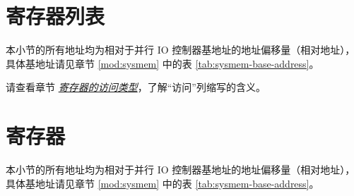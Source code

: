 \documentclass[main\_\_CN.tex]{subfiles}
\begin{document}



\clearpage
\hypertarget{parlio-reg-summ}{}
\section{寄存器列表}
\label{sec:parlio-reg-summ}

本小节的所有地址均为相对于并行 IO 控制器基地址的地址偏移量（相对地址），具体基地址请见章节 \ref{mod:sysmem} \textit{} 中的表 \ref{tab:sysmem-base-address}。

请查看章节 \hyperref[glossary-access-types]{\textit{寄存器的访问类型}}，了解“访问”列缩写的含义。






\clearpage
\section{寄存器}

本小节的所有地址均为相对于并行 IO 控制器基地址的地址偏移量（相对地址），具体基地址请见章节 \ref{mod:sysmem} \textit{} 中的表 \ref{tab:sysmem-base-address}。


\end{document}
